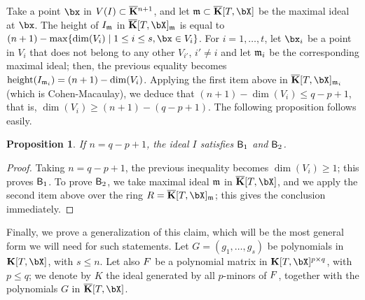 \documentclass[12pt]{article}
\newtheorem{proposition}[definition]{Proposition}
\begin{document}
Take a point $\bx$ in $V(I)\subset \overline{\mathbf{K}}{}^{n+1}$, and let $\m \subset
\KKbar[T,\bX]$ be the maximal ideal at $\bx$. The height of
$I_{\mathfrak{m}}$ in $\KKbar[T,\bX]_\m$ is equal to $(n+1)-\max\{ \dim(V_i)
\mid 1 \le i \le s, \bx \in V_i\}$. For $i=1,\dots,t$, let $\bx_i$
be a point in $V_i$ that does not belong to any other $V_{i'}$, $i'
\ne i$ and let $\mathfrak{m}_i$ be the corresponding maximal ideal; then, the
previous equality becomes ${\rm height}(I_{\mathfrak{m}_i})=(n+1)-\dim(V_i)$.
Applying the first item above in $\KKbar[T,\bX]_{\m_i}$ (which
is Cohen-Macaulay), we deduce that $(n+1)-\dim(V_i) \le q-p+1$, that is,
$\dim(V_i) \ge (n+1) -(q-p+1)$. The following proposition
follows easily.

\begin{proposition}
  If $n=q-p+1$, the ideal $I$ satisfies $\mathsf{B}_1$ and $\mathsf{B}_2$.
\end{proposition}
\begin{proof}
  Taking $n=q-p+1$, the previous inequality becomes $\dim(V_i) \ge 1$;
  this proves $\mathsf{B}_1$.  To prove $\mathsf{B}_2$, we take maximal
  ideal $\mathfrak{m}$ in $\KKbar[T,\bX]$, and we apply the second item above
  over the ring $R=\KKbar[T,\bX]_\m$; this gives the conclusion
  immediately.
\end{proof}



Finally, we prove a generalization of this claim, which will be the
most general form we will need for such statements. Let
$G=(g_1,\dots,g_s)$ be polynomials in $\KK[T,\bX]$, with $s \le
n$. Let also ${F}$ be a polynomial matrix in $\KK[T,\bX]^{p \times
  q}$, with $p \le q$; we denote by $K$ the ideal generated by all
$p$-minors of ${F}$, together with the polynomials $G$ in
$\KKbar[T,\bX]$.
\end{document}
